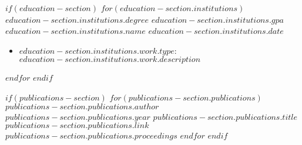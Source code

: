 $if(education-section)$
$for(education-section.institutions)$
\education
{$education-section.institutions.degree$}
{$education-section.institutions.gpa$}
{\href{$education-section.institutions.url$}{$education-section.institutions.name$}}
{$education-section.institutions.date$}
\begin{itemize}
\setlength\itemsep{0pt}
\item
$education-section.institutions.work.type$:
$education-section.institutions.work.description$
\end{itemize}
$endfor$
$endif$
\vspace{-15pt}

$if(publications-section)$
$for(publications-section.publications)$
\vspace{-15pt}
\publication
{$publications-section.publications.author$}
{$publications-section.publications.year$}
{$publications-section.publications.title$}
{$publications-section.publications.link$}
{$publications-section.publications.proceedings$}
$endfor$
$endif$



